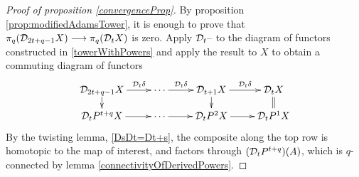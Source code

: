 \documentclass[11pt]{amsart}
\theoremstyle{plain}
\newcommand{\caldup}[1]{\calD_{\smash{#1}}}
\begin{document}
\begin{proof}[Proof of proposition \ref{convergenceProp}]
By proposition \ref{prop:modifiedAdamsTower}, it is enough to prove that $\pi_q(\caldup{2t+q-1}X)\to\pi_q(\caldup{t}X)$ is zero.
Apply $\caldup{t}\DASH$ to the diagram of functors constructed in \ref{towerWithPowers} and apply the result to $X$ to obtain a commuting diagram of functors
\[\xymatrix@R=4mm{
\caldup{2t+q-1}X
\ar[r]^-{\caldup{t}\delta}
\ar[d]
&
\cdots \ar[r]^-{\caldup{t}\delta}
&%
\caldup{t+1}X
\ar[r]^-{\caldup{t}\delta}
\ar[d]&%
\caldup{t}X
\ar@{=}[d]
\\%
\caldup{t}P^{t+q}X
\ar[r]
&%
\cdots 
\ar[r]&%
\caldup{t}P^2X
\ar[r]
&%
\caldup{t}P^1X%
}\]
By the twisting lemma, \ref{DsDt=Dt+s}, the composite along the top row is homotopic to the map of interest, and factors through $(\caldup{t}P^{t+q})(A)$, which is $q$-connected by lemma \ref{connectivityOfDerivedPowers}.
\end{proof}







\appendix
\end{document}
